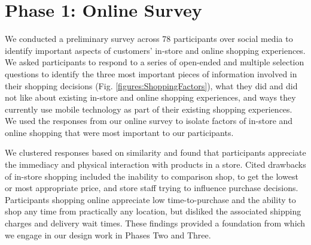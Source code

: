 \section{Phase 1: Online Survey}

We conducted a preliminary survey across 78 participants over social media to identify important aspects of customers' in-store and online shopping experiences. We asked participants to respond to a series of open-ended and multiple selection questions to identify the three most important pieces of information involved in their shopping decisions (Fig. \ref{figures:ShoppingFactors}), what they did and did not like about existing in-store and online shopping experiences, and ways they currently use mobile technology as part of their existing shopping experiences. We used the responses from our online survey to isolate factors of in-store and online shopping that were most important to our participants. 

We clustered responses based on similarity and found that participants appreciate the immediacy and physical interaction with products in a store. Cited drawbacks of in-store shopping included the inability to comparison shop, to get the lowest or most appropriate price, and store staff trying to influence purchase decisions.  Participants shopping online appreciate low time-to-purchase and the ability to shop any time from practically any location, but disliked the associated shipping charges and delivery wait times. These findings provided a foundation from which we engage in our design work in Phases Two and Three. 
